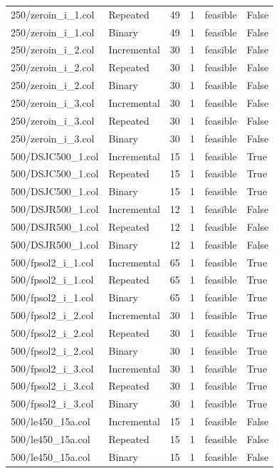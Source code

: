 \begin{table}[htbp]
\begin{tabular}{llllll}
250/zeroin\_i\_1.col & Repeated & 49 & 1 & feasible & False \\
250/zeroin\_i\_1.col & Binary & 49 & 1 & feasible & False \\
250/zeroin\_i\_2.col & Incremental & 30 & 1 & feasible & False \\
250/zeroin\_i\_2.col & Repeated & 30 & 1 & feasible & False \\
250/zeroin\_i\_2.col & Binary & 30 & 1 & feasible & False \\
250/zeroin\_i\_3.col & Incremental & 30 & 1 & feasible & False \\
250/zeroin\_i\_3.col & Repeated & 30 & 1 & feasible & False \\
250/zeroin\_i\_3.col & Binary & 30 & 1 & feasible & False \\
500/DSJC500\_1.col & Incremental & 15 & 1 & feasible & True \\
500/DSJC500\_1.col & Repeated & 15 & 1 & feasible & True \\
500/DSJC500\_1.col & Binary & 15 & 1 & feasible & True \\
500/DSJR500\_1.col & Incremental & 12 & 1 & feasible & False \\
500/DSJR500\_1.col & Repeated & 12 & 1 & feasible & False \\
500/DSJR500\_1.col & Binary & 12 & 1 & feasible & False \\
500/fpsol2\_i\_1.col & Incremental & 65 & 1 & feasible & True \\
500/fpsol2\_i\_1.col & Repeated & 65 & 1 & feasible & True \\
500/fpsol2\_i\_1.col & Binary & 65 & 1 & feasible & True \\
500/fpsol2\_i\_2.col & Incremental & 30 & 1 & feasible & True \\
500/fpsol2\_i\_2.col & Repeated & 30 & 1 & feasible & True \\
500/fpsol2\_i\_2.col & Binary & 30 & 1 & feasible & True \\
500/fpsol2\_i\_3.col & Incremental & 30 & 1 & feasible & True \\
500/fpsol2\_i\_3.col & Repeated & 30 & 1 & feasible & True \\
500/fpsol2\_i\_3.col & Binary & 30 & 1 & feasible & True \\
500/le450\_15a.col & Incremental & 15 & 1 & feasible & False \\
500/le450\_15a.col & Repeated & 15 & 1 & feasible & False \\
500/le450\_15a.col & Binary & 15 & 1 & feasible & False \\

\end{tabular}
\end{table}
